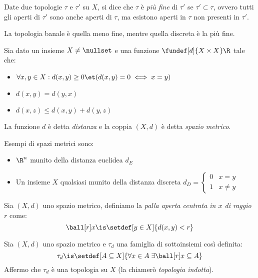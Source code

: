 \begin{defn}[Finezza]
Date due topologie $\tau$ e $\tau'$ su $X$, si dice che $\tau$ è \emph{più fine} di $\tau'$ se $\tau'\subset\tau$, ovvero tutti gli aperti di $\tau'$ sono anche aperti di $\tau$, ma esistono aperti in $\tau$ non presenti in $\tau'$.
\end{defn}

\begin{oss}
	La topologia banale è quella meno fine, mentre quella discreta è la più fine.
\end{oss}


\begin{defn}
Sia dato un insieme $X\neq\nullset$ e una funzione $\fundef[d]{X \times X}\R$ tale che:
\begin{itemize}
\item $\forall x,y \in X:  d(x,y)\ge0 \et (d(x,y)=0 \iff x=y)$
\item $d(x,y) = d(y,x)$
\item $d(x,z) \le d(x,y) + d(y,z)$
\end{itemize}
La funzione $d$ è detta \emph{distanza} e la coppia $(X,d)$ è detta \emph{spazio metrico}.
\end{defn}

\begin{es}
	\label{es:spazimetrici}
Esempi di spazi metrici sono:
\begin{itemize}
\item  $\R^n$ munito della distanza euclidea $d_E$
\item Un insieme $X$ qualsiasi munito della distanza discreta $d_D= \begin{cases} 0 & x=y \\ 1 & x \neq y \end{cases}$
\end{itemize}
\end{es}

\begin{defn}
Sia $(X,d)$ uno spazio metrico, definiamo la \emph{palla aperta centrata in $x$ di raggio $r$} come:
\[\ball[r]x \is \setdef[y \in X]{d(x,y) < r}\]
\end{defn}

\begin{prop}
Sia $(X, d)$ uno spazio metrico e $\tau_d$ una famiglia di sottoinsiemi così definita:
\[\tau_d \is \setdef[A \subseteq  X]{\forall x \in A \;\exists \ball[r]x \subseteq A}\]
Affermo che $\tau_d$ è una topologia su $X$ (la chiamerò \emph{topologia indotta}).
\end{prop}

